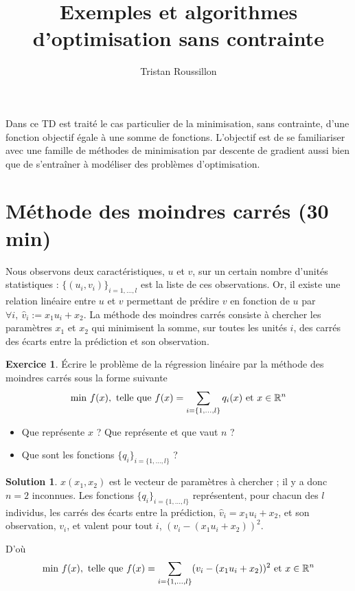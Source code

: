 \documentclass[a4paper,francais]{article}
\title{Exemples et algorithmes d'optimisation sans contrainte}
\author{Tristan Roussillon}
\newcommand{\R}{{\ensuremath\mathbb{R}}}
\theoremstyle{definition}
\newtheorem{exercice}{Exercice}[section]
\newtheorem*{solution}{Solution}
\begin{document}
\maketitle

Dans ce TD est traité le cas particulier de la minimisation, sans contrainte,
d'une fonction objectif égale à une somme de fonctions. L'objectif est de se
familiariser avec une famille de méthodes de minimisation par descente de
gradient aussi bien que de s'entraîner à modéliser des problèmes d'optimisation.

\section{Méthode des moindres carrés (30 min)}
\label{sec:mc}

Nous observons deux caractéristiques, $u$ et $v$, sur un certain nombre d'unités
statistiques : $\{(u_i,v_i)\}_{i = 1,\dots, l}$ est la liste de ces observations.
Or, il existe une relation linéaire entre $u$ et $v$ permettant
de prédire $v$ en fonction de $u$ par $\forall i, \ \hat{v}_i := x_1u_i + x_2$.
La méthode des moindres carrés consiste à chercher les paramètres $x_1$ et $x_2$
qui minimisent la somme, sur toutes les unités $i$, des carrés des écarts entre la
prédiction et son observation. 

\begin{exercice}
  \'Ecrire le problème de la régression linéaire par la méthode des moindres carrés
  sous la forme suivante
  \[
  \text{min} \ f(x), \ \text{telle que} \
  f(x) = \sum_{i = \{1,\dots,l\}} q_i(x) \ \text{et} \ x \in \R^n
  \]

  \begin{itemize}
  \item Que représente $x$ ? Que représente et que vaut $n$ ?
  \item Que sont les fonctions $\{q_i\}_{i = \{1,\dots,l\}}$ ?
  \end{itemize}
\end{exercice}

\begin{solution}
  $x(x_1,x_2)$ est le vecteur de paramètres à chercher ; il y a donc $n=2$ inconnues.
  Les fonctions $\{q_i\}_{i = \{1,\dots,l\}}$ représentent, pour chacun des $l$ individus, les carrés des
  écarts entre la prédiction, $\hat{v}_i = x_1u_i + x_2$, et son observation, $v_i$, et valent pour tout $i$,
  $(v_i - (x_1u_i + x_2))^2$.

  D'où
  \[
  \text{min} \ f(x), \ \text{telle que} \
  f(x) = \sum_{i = \{1,\dots,l\}} (v_i - (x_1u_i + x_2))^2 \ \text{et} \ x \in \R^n
  \]
\end{solution}
\end{document}
